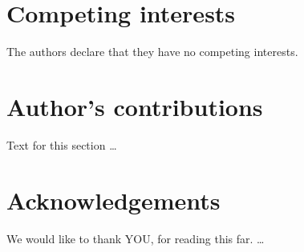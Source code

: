 \documentclass{bmcart}
\begin{document}
\begin{backmatter}

\section*{Competing interests}
  The authors declare that they have no competing interests.

\section*{Author's contributions}
    Text for this section \ldots

\section*{Acknowledgements}
  We would like to thank YOU, for reading this far.  \ldots





\end{backmatter}
\end{document}
